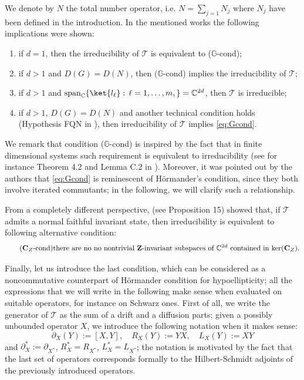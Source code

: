 \documentclass[preprint]{elsarticle}
\theoremstyle{definition}
\def\CC{\mathbb{C}}
\def\TT{\mathcal{T}}
\begin{document}
We denote by $N$ the total number operator, i.e. $N=\sum_{j=1}N_j$ where $N_j$ have been defined in the introduction. In the mentioned works the following implications were shown:
\begin{enumerate}
\item if $d=1$, then the irreducibility of $\TT$ is equivalent to ($\mathbb{G}$-cond);
\item if $d>1$ and $D(G)=D(N)$, then ($\mathbb{G}$-cond) implies the irreducibility of $\TT$;
\item if $d>1$ and ${\rm span}_{\CC}\{\ket{l_\ell}: \, \ell=1, \dots, m, \}=\CC^{2d}$, then $\TT$ is irreducible;
\item if $d>1$, $D(G)=D(N)$ and another technical condition holds (Hypothesis FQN in \cite{FP22}), then irreducibility of $\TT$ implies \eqref{eq:Gcond}.
\end{enumerate}
We remark that condition ($\mathbb{G}$-cond) is inspired by the fact that in finite dimensional systems such requirement is equivalent to irreducibility (see for instance Theorem 4.2 and Lemma C.2 in \cite{FG25}). Moreover, it was pointed out by the authors that \eqref{eq:Gcond} is reminescent of H\"ormander's condition, since they both involve iterated commutants; in the following, we will clarify such a relationship.

From a completely different perspective, \cite{GP26} (see Proposition 15) showed that, if $\TT$ admits a normal faithful invariant state, then irreducibility is equivalent to following alternative condition:
\begin{equation}  \tag{$\mathbf{C}_{Z}$-cond} \label{eq:CZcond}
\text{there are no no nontrivial $\mathbf{Z}$-invariant subspaces of $\CC^{2d}$ contained in $\ker(\mathbf{C}_{Z})$.}
\end{equation}

Finally, let us introduce the last condition, which can be considered as a noncommutative counterpart of H\"ormander condition for hypoellipticity; all the expressions that we will write in the following make sense when evaluated on suitable operators, for instance on Schwarz ones. First of all, we write the generator of $\TT$ as the sum of a drift and a diffusion parts; given a possibly unbounded operator $X$, we introduce the following notation when it makes sense:
$$\partial_X(Y):=[X,Y], \quad  R_X(Y):=YX, \quad L_X(Y):=XY$$
and $\partial^*_X:=\partial_{X^*}$, $R^*_X=R_{X^*}$, $L^*_X=L_{X^*}$; the notation is motivated by the fact that the last set of operators corresponds formally to the Hilbert-Schmidt adjoints of the previously introduced operators.
\end{document}
